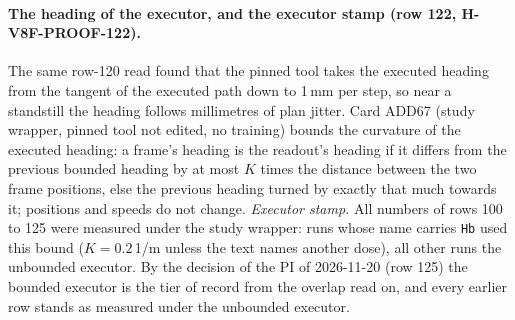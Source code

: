 \paragraph{The heading of the executor, and the executor stamp (row 122, H-V8F-PROOF-122).} The same row-120 read found that the pinned tool takes the executed heading from the tangent of the executed path down to 1\,mm per step, so near a standstill the heading follows millimetres of plan jitter. Card ADD67 (study wrapper, pinned tool not edited, no training) bounds the curvature of the executed heading: a frame's heading is the readout's heading if it differs from the previous bounded heading by at most $K$ times the distance between the two frame positions, else the previous heading turned by exactly that much towards it; positions and speeds do not change. \emph{Executor stamp.} All  numbers of rows 100 to 125 were measured under the study wrapper: runs whose name carries \texttt{Hb} used this bound ($K=0.2$\,1/m unless the text names another dose), all other runs the unbounded executor. By the decision of the PI of 2026-11-20 (row 125) the bounded executor is the tier of record from the overlap read on, and every earlier  row stands as measured under the unbounded executor.

